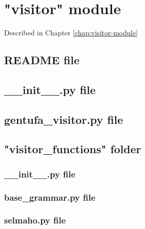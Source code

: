\chapter{"visitor" module}
\label{appendix:gentufa-visitor-annex}

Described in Chapter \ref{chap:visitor-module}

\section{README file}



\section{\_\_init\_\_.py file}



\section{gentufa\_visitor.py file}



\section{"visitor\_functions" folder}

\subsection{\_\_init\_\_.py file}



\subsection{base\_grammar.py file}



\subsection{selmaho.py file}



